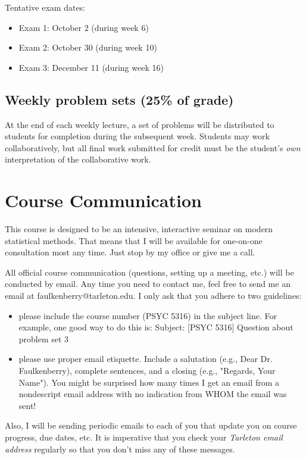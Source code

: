\documentclass[10pt]{article}
\begin{document}
Tentative exam dates:

\begin{itemize}
\item Exam 1: October 2 (during week 6)
\item Exam 2: October 30 (during week 10)
\item Exam 3: December 11 (during week 16)
\end{itemize}

\subsection*{Weekly problem sets (25\% of grade)}
\label{sec-5-2}
At the end of each weekly lecture, a set of problems will be distributed to students for completion during the subsequent week.  Students may work collaboratively, but all final work submitted for credit must be the student's \emph{own} interpretation of the collaborative work.

\section*{Course Communication}
\label{sec-6}

This course is designed to be an intensive, interactive seminar on modern statistical methods.  That means that I will be available for one-on-one consultation most any time.  Just stop by my office or give me a call.

All official course communication (questions, setting up a meeting, etc.) will be conducted by email.  Any time you need to contact me, feel free to send me an email at faulkenberry@tarleton.edu.  I only ask that you adhere to two guidelines:
\begin{itemize}
\item please include the course number (PSYC 5316) in the subject line.  For example, one good way to do this is:  Subject: [PSYC 5316] Question about problem set 3
\item please use proper email etiquette.  Include a salutation (e.g., Dear Dr. Faulkenberry), complete sentences, and a closing (e.g., "Regards, Your Name").  You might be surprised how many times I get an email from a nondescript email address with no indication from WHOM the email was sent!
\end{itemize}

Also, I will be sending periodic emails to each of you that update you on course progress, due dates, etc.  It is imperative that you check your \emph{Tarleton email address} regularly so that you don't miss any of these messages.
\end{document}
